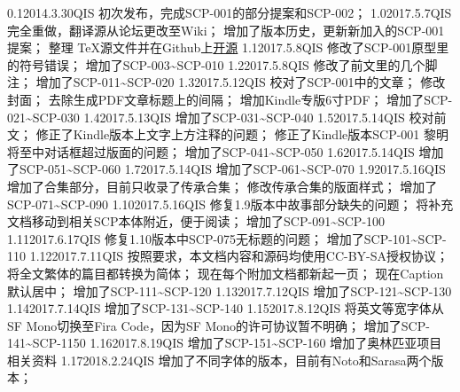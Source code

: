 


\begin{versionhistory}
\vhEntry
{0.1}{2014.3.30}{QIS}{
	初次发布，完成SCP-001的部分提案和SCP-002；
}
\vhEntry
{1.0}{2017.5.7}{QIS}{
	完全重做，翻译源从论坛更改至Wiki；
	增加了版本历史，更新新加入的SCP-001提案；
	整理 \TeX 源文件并在Github上\href{https://github.com/7sDream/scp-pdf}{开源}
}
\vhEntry
{1.1}{2017.5.8}{QIS}{
	修改了SCP-001原型里的符号错误；
	增加了SCP-003\textasciitilde SCP-010
}
\vhEntry
{1.2}{2017.5.8}{QIS}{
	修改了前文里的几个脚注；
	增加了SCP-011\textasciitilde SCP-020
}
\vhEntry
{1.3}{2017.5.12}{QIS}{
	校对了SCP-001中的文章；
	修改封面；
	去除生成PDF文章标题上的间隔；
	增加Kindle专版6寸PDF；
	增加了SCP-021\textasciitilde SCP-030
}
\vhEntry
{1.4}{2017.5.13}{QIS}{
    增加了SCP-031\textasciitilde SCP-040
}
\vhEntry
{1.5}{2017.5.14}{QIS}{
    校对前文；
    修正了Kindle版本上文字上方注释的问题；
    修正了Kindle版本SCP-001 黎明将至中对话框超过版面的问题；
    增加了SCP-041\textasciitilde SCP-050
}
\vhEntry
{1.6}{2017.5.14}{QIS}{
    增加了SCP-051\textasciitilde SCP-060
}
\vhEntry
{1.7}{2017.5.14}{QIS}{
    增加了SCP-061\textasciitilde SCP-070
}
\vhEntry
{1.9}{2017.5.16}{QIS}{
    增加了合集部分，目前只收录了传承合集；
    修改传承合集的版面样式；
    增加了SCP-071\textasciitilde SCP-090
}
\vhEntry
{1.10}{2017.5.16}{QIS}{
    修复1.9版本中故事部分缺失的问题；
    将补充文档移动到相关SCP本体附近，便于阅读；
    增加了SCP-091\textasciitilde SCP-100
}
\vhEntry
{1.11}{2017.6.17}{QIS}{
    修复1.10版本中SCP-075无标题的问题；
    增加了SCP-101\textasciitilde SCP-110
}
\vhEntry
{1.12}{2017.7.11}{QIS}{
    按照要求，本文档内容和源码均使用CC-BY-SA授权协议；
    将全文繁体的篇目都转换为简体；
    现在每个附加文档都新起一页；
    现在Caption默认居中；
    增加了SCP-111\textasciitilde SCP-120
}
\vhEntry
{1.13}{2017.7.12}{QIS}{
    增加了SCP-121\textasciitilde SCP-130
}
\vhEntry
{1.14}{2017.7.14}{QIS}{
    增加了SCP-131\textasciitilde SCP-140
}
\vhEntry
{1.15}{2017.8.12}{QIS}{
    将英文等宽字体从SF Mono切换至Fira Code，因为SF Mono的许可协议暂不明确；
    增加了SCP-141\textasciitilde SCP-1150
}
\vhEntry
{1.16}{2017.8.19}{QIS}{
    增加了SCP-151\textasciitilde SCP-160
    增加了奥林匹亚项目相关资料
}
\vhEntry
{1.17}{2018.2.24}{QIS}{
    增加了不同字体的版本，目前有Noto和Sarasa两个版本；
}
\end{versionhistory}
